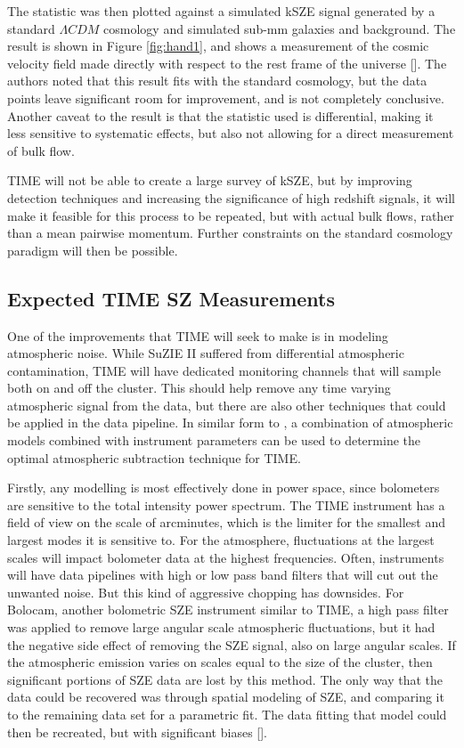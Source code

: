 \documentclass[manuscript]{aastex}
\begin{document}
The statistic was then plotted against a simulated kSZE signal generated by a standard $\Lambda CDM$  cosmology and simulated sub-mm galaxies and background. The result is shown in Figure \ref{fig:hand1}, and shows a measurement of the cosmic velocity field made directly with respect to the rest frame of the universe [\cite{Hand2012}]. The authors noted that this result fits with the standard cosmology, but the data points leave significant room for improvement, and is not completely conclusive. Another caveat to the result is that the statistic used is differential, making it less sensitive to systematic effects, but also not allowing for a direct measurement of bulk flow. 

TIME will not be able to create a large survey of kSZE, but by improving detection techniques and increasing the significance of high redshift signals, it will make it feasible for this process to be repeated, but with actual bulk flows, rather than a mean pairwise momentum. Further constraints on the standard cosmology paradigm will then be possible.  

\subsection{Expected TIME SZ Measurements}

One of the improvements that TIME will seek to make is in modeling atmospheric noise. While SuZIE II suffered from differential atmospheric contamination, TIME will have dedicated monitoring channels that will sample both on and off the cluster. This should help remove any time varying atmospheric signal from the data, but there are also other techniques that could be applied in the data pipeline. In similar form to \cite{Sayers2010}, a combination of atmospheric models combined with instrument parameters can be used to determine the optimal atmospheric subtraction technique for TIME. 

Firstly, any modelling is most effectively done in power space, since bolometers are sensitive to the total intensity power spectrum. The TIME instrument has a field of view on the scale of arcminutes, which is the limiter for the smallest and largest modes it is sensitive to. For the atmosphere, fluctuations at the largest scales will impact bolometer data at the highest frequencies. Often, instruments will have data pipelines with high or low pass band filters that will cut out the unwanted noise. But this kind of aggressive chopping has downsides. For Bolocam, another bolometric SZE instrument similar to TIME, a high pass filter was applied to remove large angular scale atmospheric fluctuations, but it had the negative side effect of removing the SZE signal, also on large angular scales. If the atmospheric emission varies on scales equal to the size of the cluster, then significant portions of SZE data are lost by this method. The only way that the data could be recovered was through spatial modeling of SZE, and comparing it to the remaining data set for a parametric fit. The data fitting that model could then be recreated, but with significant biases [\cite{Sayers2013}].
\end{document}
